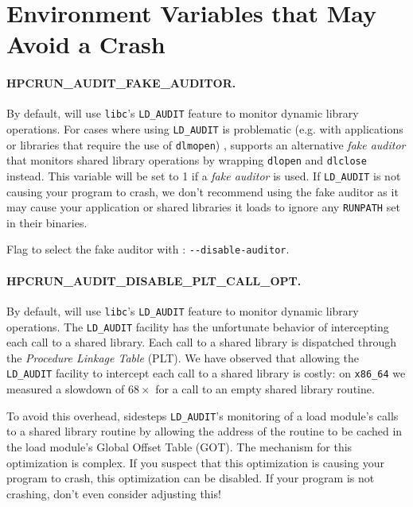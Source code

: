 \section{Environment Variables that May Avoid a Crash}

\paragraph{HPCRUN\_AUDIT\_FAKE\_AUDITOR.}

By default, \hpcrun{} will use \verb|libc|'s \verb|LD_AUDIT| feature to monitor dynamic library operations.
For cases where using \verb|LD_AUDIT| is problematic (e.g. with applications or libraries that require the use of {\tt dlmopen}) ,
\hpcrun{} supports an alternative {\em fake auditor} that monitors shared library operations by wrapping {\tt dlopen} and {\tt dlclose} instead. This variable will be set to 1 if a {\em fake auditor} is used.
If \verb|LD_AUDIT| is not causing your program to crash, we don't recommend using the fake auditor as it may cause your application or shared libraries it loads to ignore any {\tt RUNPATH} set in their binaries.

\parg
Flag to select the fake auditor with \hpcrun: \verb|--disable-auditor|.

\paragraph{HPCRUN\_AUDIT\_DISABLE\_PLT\_CALL\_OPT.}

By default, \hpcrun{} will use \verb|libc|'s \verb|LD_AUDIT| feature to monitor dynamic library operations. The \verb|LD_AUDIT| facility has the unfortunate behavior of intercepting each call to a shared library. Each call to a shared library is dispatched through  the {\em Procedure Linkage Table} (PLT). We have observed that allowing the \verb|LD_AUDIT| facility to intercept each call to a shared library is costly: on {\tt x86\_64} we measured a slowdown of $68\times$ for a call to an empty shared library routine.

To avoid this overhead, \hpcrun{} sidesteps \verb|LD_AUDIT|'s monitoring of a load module's calls to a shared library routine by allowing the address of the routine to be cached in the load module's Global Offset Table (GOT). The mechanism for this optimization is complex. If you suspect that this optimization is causing your program to crash, this optimization can be disabled. If your program is not crashing, don't even consider adjusting this!

